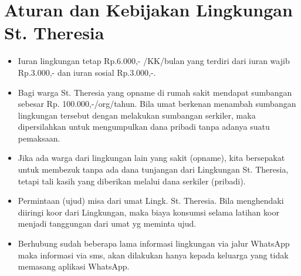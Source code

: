 \section{Aturan dan Kebijakan Lingkungan St. Theresia \tahun} 

\begin{itemize}
\item Iuran lingkungan tetap Rp.6.000,- /KK/bulan yang
terdiri dari iuran wajib Rp.3.000,- dan iuran sosial Rp.3.000,-.
\item Bagi warga St. Theresia yang opname di rumah sakit mendapat sumbangan sebesar
Rp. 100.000,-/org/tahun. Bila umat berkenan menambah sumbangan
lingkungan tersebut dengan melakukan sumbangan serkiler, maka
dipersilahkan untuk mengumpulkan dana pribadi tanpa adanya suatu
pemaksaan. 
\item Jika ada warga dari lingkungan lain yang sakit (opname), kita
bersepakat untuk membezuk tanpa ada dana tunjangan dari Lingkungan St.
Theresia, tetapi tali kasih yang diberikan melalui dana serkiler
(pribadi).
\item Permintaan (ujud) misa dari umat Lingk. St. Theresia. Bila
menghendaki diiringi koor dari Lingkungan, maka biaya konsumsi selama
latihan koor menjadi tanggungan dari umat yg meminta ujud.
\item Berhubung sudah beberapa lama informasi lingkungan via jalur WhatsApp maka informasi via sms, akan dilakukan hanya kepada keluarga yang tidak memasang aplikasi WhatsApp.
\end{itemize}

